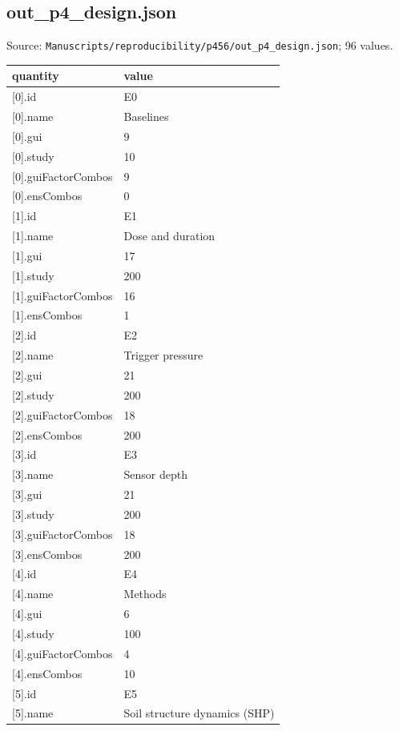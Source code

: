 \subsection*{out\_p4\_design.json}
\noindent\small Source: \nolinkurl{Manuscripts/reproducibility/p456/out_p4_design.json}; 96 values.\par
{\scriptsize\begin{longtable}{p{}p{}}\toprule\textbf{quantity} & \textbf{value}\\\midrule\endhead
{}[0].id & E0\\
{}[0].name & Baselines\\
{}[0].gui & 9\\
{}[0].study & 10\\
{}[0].guiFactorCombos & 9\\
{}[0].ensCombos & 0\\
{}[1].id & E1\\
{}[1].name & Dose and duration\\
{}[1].gui & 17\\
{}[1].study & 200\\
{}[1].guiFactorCombos & 16\\
{}[1].ensCombos & 1\\
{}[2].id & E2\\
{}[2].name & Trigger pressure\\
{}[2].gui & 21\\
{}[2].study & 200\\
{}[2].guiFactorCombos & 18\\
{}[2].ensCombos & 200\\
{}[3].id & E3\\
{}[3].name & Sensor depth\\
{}[3].gui & 21\\
{}[3].study & 200\\
{}[3].guiFactorCombos & 18\\
{}[3].ensCombos & 200\\
{}[4].id & E4\\
{}[4].name & Methods\\
{}[4].gui & 6\\
{}[4].study & 100\\
{}[4].guiFactorCombos & 4\\
{}[4].ensCombos & 10\\
{}[5].id & E5\\
{}[5].name & Soil structure dynamics (SHP)\\

\end{longtable}}
